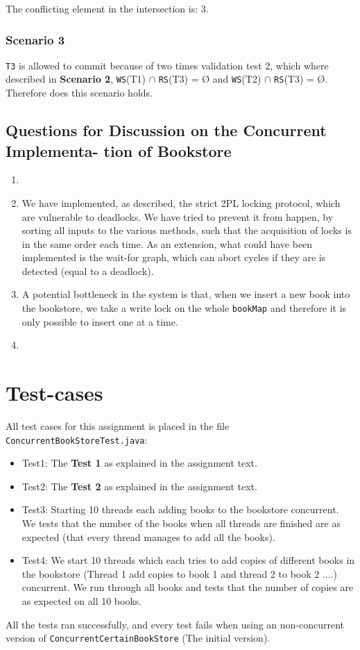 \documentclass[10pt,a4paper]{article}
\begin{document}
The conflicting element in the intersection is: 3.

\subsubsection*{Scenario 3}
\texttt{T3} is allowed to commit because of two times validation test 2, which where described in \textbf{Scenario 2}, \texttt{WS}(T1) $\cap$ \texttt{RS}(T3) = Ø and \texttt{WS}(T2) $\cap$ \texttt{RS}(T3) = Ø. Therefore does this scenario holds.

\subsection*{Questions for Discussion on the Concurrent Implementa- tion of Bookstore}

\begin{enumerate}
	\item 
	\item We have implemented, as described, the strict 2PL locking protocol, which are vulnerable to deadlocks. We have tried to prevent it from happen, by sorting all inputs to the various methods, such that the acquisition of locks is in the same order each time. As an extension, what could have been implemented is the wait-for graph, which can abort cycles if they are is detected (equal to a deadlock).
	\item A potential bottleneck in the system is that, when we insert a new book into the bookstore, we take a write lock on the whole \texttt{bookMap} and therefore it is only possible to insert one at a time. 
	\item 
\end{enumerate}

\section*{Test-cases}
All test cases for this assignment is placed in the file \texttt{ConcurrentBookStoreTest.java}:
\begin{itemize}
\item Test1: The \textbf{Test 1} as explained in the assignment text.
\item Test2: The \textbf{Test 2} as explained in the assignment text.
\item Test3:
Starting 10 threads each adding books to the bookstore concurrent. We tests that the number of the books when all threads are finished are as expected (that every thread manages to add all the books).
\item Test4:
We start 10 threads which each tries to add copies of different books in the bookstore (Thread 1 add copies to book 1 and thread 2 to book 2 ....) concurrent. We run through all books and tests that the number of copies are as expected on all 10 books. 
\end{itemize}
All the tests ran successfully, and every test fails when using an non-concurrent version of \texttt{ConcurrentCertainBookStore} (The initial version).
\end{document}
